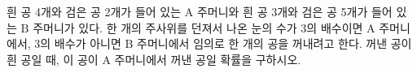흰 공 4개와 검은 공 2개가 들어 있는 $\mathrm{A}$ 주머니와 흰 공 3개와 검은 공 5개가 들어 있는 $\mathrm{B}$ 주머니가 있다. 한 개의 주사위를 던져서 나온 눈의 수가 $3$의 배수이면 $\mathrm{A}$ 주머니에서, $3$의 배수가 아니면 $\mathrm{B}$ 주머니에서 임의로 한 개의 공을 꺼내려고 한다. 꺼낸 공이 흰 공일 때, 이 공이 $\mathrm{A}$ 주머니에서 꺼낸 공일 확률을 구하시오.
